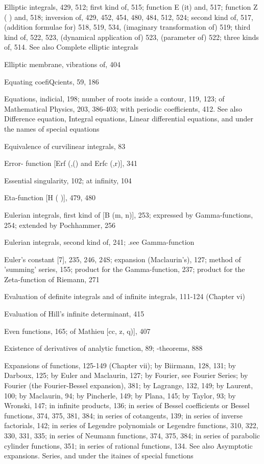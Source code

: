 %
%

Elliptic integrals, 429, 512; first kind of, 515; function E (it) and, 517; function Z ( ) and,
518; inversion of, 429, 452, 454, 480, 484, 512, 524; second kind of, 517, (addition formulae
for) 518, 519, 534, (imaginary transformation of) 519; third kind of, 522, 523, (dynamical
application of) 523, (parameter of) 522; three kinds of, 514. See also Complete elliptic
integrals

Elliptic membrane, vibrations of, 404

Equating coefiQcients, 59, 186

Equations, indicial, 198; number of roots inside a contour, 119, 123; of Mathematical Physics,
203, 386-403; with periodic coefficients, 412. See also Difference equation, Integral
equations, Linear differential equations, and under the names of special equations

Equivalence of curvilinear integrals, 83

Error- function [Erf (,() and Erfc (,r)], 341

Essential singularity, 102; at infinity, 104

Eta-function [H ( )], 479, 480

Eulerian integrals, first kind of [B (m, n)], 253; expressed by Gamma-functions, 254; extended
by Pochhammer, 256

Eulerian integrals, second kind of, 241; .see Gamma-function

Euler's constant [7], 235, 246, 24S; expansion (Maclaurin's), 127; method of 'summing' series,
155; product for the Gamma-function, 237; product for the Zeta-function of Riemann, 271

Evaluation of definite integrals and of infinite integrals, 111-124 (Chapter vi)

Evaluation of Hill's infinite determinant, 415

Even functions, 165; of Mathieu [cc,  z, q)], 407

Existence of derivatives of analytic function, 89; -theorems, 888

Expansions of functions, 125-149 (Chapter vii); by Biirmann, 128, 131; by Darboux, 125; by
Euler and Maclaurin, 127; by Fourier, see Fourier Series; by Fourier (the Fourier-Bessel
expansion), 381; by Lagrange, 132, 149; by Laurent, 100; by Maclaurin, 94; by Pincherle,
149; by Plana, 145; by Taylor, 93; by Wronski, 147; in infinite products, 136; in series of
Bessel coefficients or Bessel functions, 374, 375, 381, 384; in series of cotangents, 139; in
series of inverse factorials, 142; in series of Legendre polynomials or Legendre functions,
310, 322, 330, 331, 335; in series of Neumann functions, 374, 375, 384; in series of parabolic
cylinder functions, 351; in series of rational functions, 134. See also Asymptotic expansions.
Series, and under the itaines of special functions

